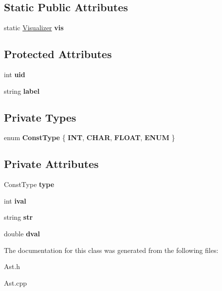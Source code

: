 \subsection*{Static Public Attributes}
\begin{DoxyCompactItemize}
\item 
\hypertarget{classAST_aca9e6637209b31e03a09c0d42f29bdfa}{static \hyperlink{classVisualizer}{Visualizer} {\bfseries vis}}\label{classAST_aca9e6637209b31e03a09c0d42f29bdfa}

\end{DoxyCompactItemize}
\subsection*{Protected Attributes}
\begin{DoxyCompactItemize}
\item 
\hypertarget{classAST_a847b778f1c3dd5a19de32de432ee6e15}{int {\bfseries uid}}\label{classAST_a847b778f1c3dd5a19de32de432ee6e15}

\item 
\hypertarget{classAST_ab2e239ccc0688d2341724432ff5a1a31}{string {\bfseries label}}\label{classAST_ab2e239ccc0688d2341724432ff5a1a31}

\end{DoxyCompactItemize}
\subsection*{Private Types}
\begin{DoxyCompactItemize}
\item 
enum {\bfseries Const\-Type} \{ {\bfseries I\-N\-T}, 
{\bfseries C\-H\-A\-R}, 
{\bfseries F\-L\-O\-A\-T}, 
{\bfseries E\-N\-U\-M}
 \}
\end{DoxyCompactItemize}
\subsection*{Private Attributes}
\begin{DoxyCompactItemize}
\item 
\hypertarget{classAstConstant_ad350f1bd35d56369731660f8f8c826e7}{Const\-Type {\bfseries type}}\label{classAstConstant_ad350f1bd35d56369731660f8f8c826e7}

\item 
\hypertarget{classAstConstant_a45b3874ec43dac2b0b56fca2f70ae310}{int {\bfseries ival}}\label{classAstConstant_a45b3874ec43dac2b0b56fca2f70ae310}

\item 
\hypertarget{classAstConstant_a79f98612fb8aa367b279ad199c794b31}{string {\bfseries str}}\label{classAstConstant_a79f98612fb8aa367b279ad199c794b31}

\item 
\hypertarget{classAstConstant_a6a7521fd6217f7d8eba703ba6877be9d}{double {\bfseries dval}}\label{classAstConstant_a6a7521fd6217f7d8eba703ba6877be9d}

\end{DoxyCompactItemize}


The documentation for this class was generated from the following files\-:\begin{DoxyCompactItemize}
\item 
Ast.\-h\item 
Ast.\-cpp\end{DoxyCompactItemize}
